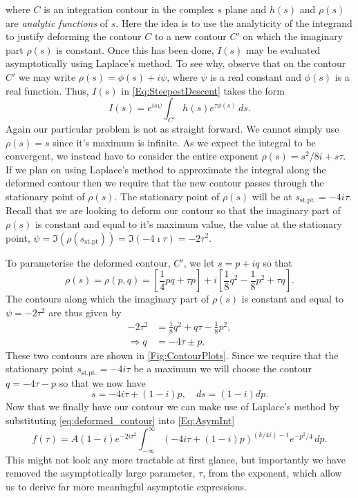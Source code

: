 where $C$ is an integration contour in the complex $s$ plane and $h(s)$ and $\rho(s)$ are \emph{analytic functions} of $s$. 
Here the idea is to use the analyticity of the integrand to justify deforming the contour $C$ to a new contour $C'$ on which the imaginary part $\rho(s)$ is constant.
Once this has been done, $I(s)$ may be evaluated asymptotically using Laplace's method. 
To see why, observe that on the contour $C'$ we may write $\rho(s) = \phi(s) + i \psi$, where $\psi$ is a real constant and $\phi(s)$ is a real function. 
Thus, $I(s)$ in \autoref{Eq:SteepestDescent} takes the form
\begin{equation}
	I(s) = e^{is\psi} \int_{C'}h(s) e^{\tau\phi(s)}\, ds.
\end{equation}
Again our particular problem is not as straight forward. We cannot simply use $\rho(s) = s$ since it's maximum is infinite. As we expect the integral to be convergent, we instead have to consider the entire exponent $\rho(s) = s^{2}/8i+s\tau$. 
If we plan on using Laplace's method to approximate the integral along the deformed contour then we require that the new contour passes through the stationary point of $\rho(s)$. 
The stationary point of $\rho(s)$ will be at $ s_{\text{st.pt.}} = -4i\tau$. 
Recall that we are looking to deform our contour so that the imaginary part of $\rho(s)$ is constant and equal to it's maximum value, the value at the stationary point, $\psi = \Im(\rho(s_{\text{st.pt}})) = \Im(-4\imath\tau) = -2\tau^{2}$.

To parameterise the deformed contour, $C'$, we let $s = p + iq$ so that  
\begin{equation}
	\rho(s) = \rho(p,q) = \left[\frac{1}{4}pq + \tau p\right] + i \left[ \frac{1}{8}q^{2} - \frac{1}{8}p^{2} + \tau q\right].
\end{equation}
The contours along which the imaginary part of $\rho(s)$ is constant and equal to $\psi=-2\tau^{2}$ are thus given by
\begin{align}
	-2\tau^{2} &= \frac{1}{8}q^{2} + q\tau - \frac{1}{8}p^{2},\\
	\Rightarrow q &= -4\tau \pm p.
\end{align}
These two contours are shown in \autoref{Fig:ContourPlots}. 
Since we require that the stationary point $s_{\text{st.pt.}}=-4i\tau$ be a maximum we will choose the contour $q=-4\tau-p$ so that we now have
\begin{equation}
	s = -4i \tau + \left(1 - i\right)p, \quad ds = \left(1 - i\right) dp. \label{eq:deformed_contour}
\end{equation}
Now that we finally have our contour we can make use of Laplace's method by substituting \autoref{eq:deformed_contour} into \autoref{Eq:AsymInt}
\begin{equation}
	f(\tau) =A\left(1-i\right)e^{-2i\tau^{2}}\int_{-\infty}^{\infty}\left(-4i\tau + \left(1-i\right)p\right)^{(k/4i)-1}e^{-p^{2}/4}\, dp. \label{eq:laplace_f}
\end{equation}
This might not look any more tractable at first glance, but importantly we have removed the asymptotically large parameter, $\tau$, from the exponent, which allow us to derive far more meaningful asymptotic expressions.

